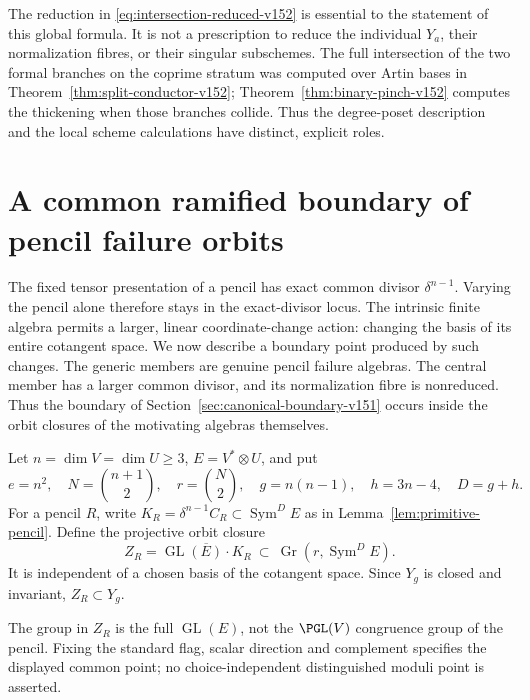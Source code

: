 \documentclass[11pt,reqno]{amsart}
\numberwithin{equation}{section}
\theoremstyle{definition}\newtheorem{definition}[theorem]{Definition}
\theoremstyle{remark}\newtheorem{remark}[theorem]{Remark}
\DeclareMathOperator{\Sym}{Sym}\DeclareMathOperator{\Gr}{Gr}
\begin{document}
The reduction in \eqref{eq:intersection-reduced-v152} is essential
to the statement of this global formula.  It is not a prescription
to reduce the individual $Y_a$, their normalization fibres, or their
singular subschemes.  The full intersection of the two formal
branches on the coprime stratum was computed over Artin bases in
Theorem~\ref{thm:split-conductor-v152};
Theorem~\ref{thm:binary-pinch-v152} computes the thickening when
those branches collide.  Thus the degree-poset description and
the local scheme calculations have distinct, explicit roles.

\section{A common ramified boundary of pencil failure orbits}
\label{sec:orbit-boundary-v152}

The fixed tensor presentation of a pencil has exact common divisor
$\delta^{n-1}$.  Varying the pencil alone therefore stays in the
exact-divisor locus.  The intrinsic finite algebra permits a larger,
linear coordinate-change action: changing the basis of its entire cotangent
space.  We now describe a boundary point produced by such changes.
The generic members are genuine pencil failure algebras.  The central
member has a larger common divisor, and its normalization fibre is
nonreduced.  Thus the boundary of Section~\ref{sec:canonical-boundary-v151}
occurs inside the orbit closures of the motivating algebras themselves.

Let $n=\dim V=\dim U\geq3$, $E=V^*\otimes U$, and put
\[
 e=n^2,\quad N=\binom{n+1}{2},\quad r=\binom N2,\quad
 g=n(n-1),\quad h=3n-4,\quad D=g+h.
\]
For a pencil $R$, write $K_R=\delta^{n-1}C_R\subset\Sym^D E$
as in Lemma~\ref{lem:primitive-pencil}.  Define the projective orbit
closure
\[
 Z_R=\overline{\operatorname{GL}(E)\cdot K_R}
                  \ \subset\ \Gr(r,\Sym^D E).
\]
It is independent of a chosen basis of the cotangent space.  Since
$Y_g$ is closed and invariant, $Z_R\subset Y_g$.

The group in $Z_R$ is the full $\operatorname{GL}(E)$, not the
$\PGL(V)$ congruence group of the pencil. Fixing the standard flag,
scalar direction and complement specifies the displayed common point;
no choice-independent distinguished moduli point is asserted.
\end{document}
